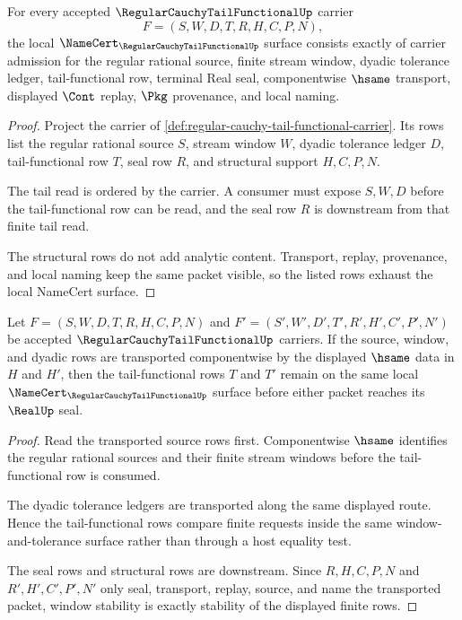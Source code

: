 \begin{theorem}
\label{thm:regular-cauchy-tail-functional-namecert-obligations}
For every accepted $\RegularCauchyTailFunctionalUp$ carrier
$$
F=(S,W,D,T,R,H,C,P,N),
$$
the local $\NameCert_{\RegularCauchyTailFunctionalUp}$ surface consists exactly of carrier admission for the regular rational source, finite stream window, dyadic tolerance ledger, tail-functional row, terminal Real seal, componentwise $\hsame$ transport, displayed $\Cont$ replay, $\Pkg$ provenance, and local naming.
\end{theorem}
\begin{proof}
Project the carrier of \autoref{def:regular-cauchy-tail-functional-carrier}. Its rows list the regular rational source $S$, stream window $W$, dyadic tolerance ledger $D$, tail-functional row $T$, seal row $R$, and structural support $H,C,P,N$.

The tail read is ordered by the carrier. A consumer must expose $S,W,D$ before the tail-functional row can be read, and the seal row $R$ is downstream from that finite tail read.

The structural rows do not add analytic content. Transport, replay, provenance, and local naming keep the same packet visible, so the listed rows exhaust the local NameCert surface.
\end{proof}

\begin{theorem}
\label{thm:regular-cauchy-tail-functional-window-stability}
Let $F=(S,W,D,T,R,H,C,P,N)$ and $F'=(S',W',D',T',R',H',C',P',N')$ be accepted $\RegularCauchyTailFunctionalUp$ carriers. If the source, window, and dyadic rows are transported componentwise by the displayed $\hsame$ data in $H$ and $H'$, then the tail-functional rows $T$ and $T'$ remain on the same local $\NameCert_{\RegularCauchyTailFunctionalUp}$ surface before either packet reaches its $\RealUp$ seal.
\end{theorem}
\begin{proof}
Read the transported source rows first. Componentwise $\hsame$ identifies the regular rational sources and their finite stream windows before the tail-functional row is consumed.

The dyadic tolerance ledgers are transported along the same displayed route. Hence the tail-functional rows compare finite requests inside the same window-and-tolerance surface rather than through a host equality test.

The seal rows and structural rows are downstream. Since $R,H,C,P,N$ and $R',H',C',P',N'$ only seal, transport, replay, source, and name the transported packet, window stability is exactly stability of the displayed finite rows.
\end{proof}

